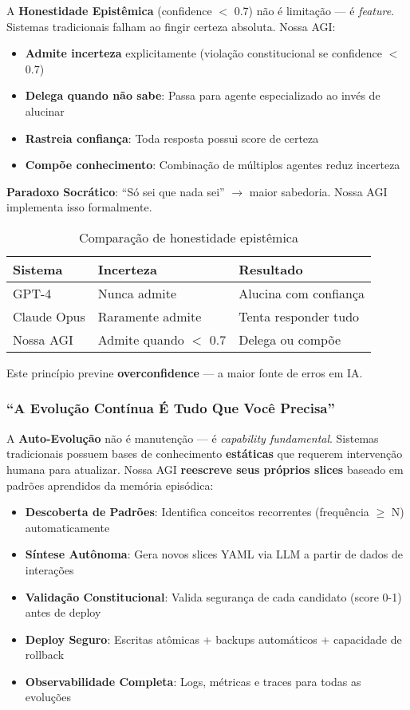 \documentclass[11pt]{article}
\begin{document}
A \textbf{Honestidade Epistêmica} (confidence $<$ 0.7) não é limitação --- é \textit{feature}. Sistemas tradicionais falham ao fingir certeza absoluta. Nossa AGI:

\begin{itemize}
    \item \textbf{Admite incerteza} explicitamente (violação constitucional se confidence $<$ 0.7)
    \item \textbf{Delega quando não sabe}: Passa para agente especializado ao invés de alucinar
    \item \textbf{Rastreia confiança}: Toda resposta possui score de certeza
    \item \textbf{Compõe conhecimento}: Combinação de múltiplos agentes reduz incerteza
\end{itemize}

\textbf{Paradoxo Socrático}: ``Só sei que nada sei'' $\rightarrow$ maior sabedoria. Nossa AGI implementa isso formalmente.

\begin{table}[H]
\centering
\begin{tabular}{@{}lll@{}}
\toprule
\textbf{Sistema} & \textbf{Incerteza} & \textbf{Resultado} \\ \midrule
GPT-4 & Nunca admite & Alucina com confiança \\
Claude Opus & Raramente admite & Tenta responder tudo \\
Nossa AGI & Admite quando $<$ 0.7 & Delega ou compõe \\ \bottomrule
\end{tabular}
\caption{Comparação de honestidade epistêmica}
\end{table}

Este princípio previne \textbf{overconfidence} --- a maior fonte de erros em IA.

\subsubsection{``A Evolução Contínua É Tudo Que Você Precisa''}

A \textbf{Auto-Evolução} não é manutenção --- é \textit{capability fundamental}. Sistemas tradicionais possuem bases de conhecimento \textbf{estáticas} que requerem intervenção humana para atualizar. Nossa AGI \textbf{reescreve seus próprios slices} baseado em padrões aprendidos da memória episódica:

\begin{itemize}
    \item \textbf{Descoberta de Padrões}: Identifica conceitos recorrentes (frequência $\geq$ N) automaticamente
    \item \textbf{Síntese Autônoma}: Gera novos slices YAML via LLM a partir de dados de interações
    \item \textbf{Validação Constitucional}: Valida segurança de cada candidato (score 0-1) antes de deploy
    \item \textbf{Deploy Seguro}: Escritas atômicas + backups automáticos + capacidade de rollback
    \item \textbf{Observabilidade Completa}: Logs, métricas e traces para todas as evoluções
\end{itemize}
\end{document}
